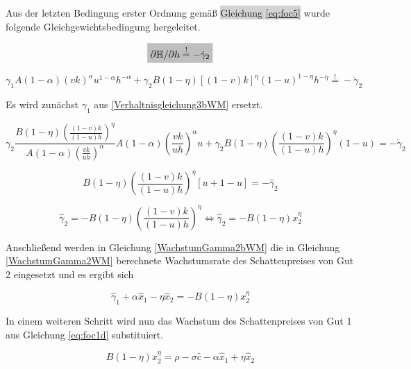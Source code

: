 Aus der letzten Bedingung erster Ordnung gemä{\ss} \colorbox{lightgray}{Gleichung \eqref{eq:foc5}} wurde folgende Gleichgewichtsbedingung hergeleitet.


	\begin{equation*}
		\colorbox{lightgray}{$\partial\mathbb{H}/\partial h\overset{!}{=}-\dot{\gamma}_2$}
	\end{equation*}


	\begin{equation}
		\gamma_1A(1-\alpha)(vk)^\alpha u^{1-\alpha}h^{-\alpha}+\gamma_2 B(1-\eta)[(1-v)k]^{\eta}(1-u)^{1-\eta}h^{-\eta}\overset{!}{=}-\dot{\gamma}_2
	\end{equation}


Es wird zunächst $\gamma_1$ aus \eqref{Verhaltnisgleichung3bWM} ersetzt. 


	\begin{equation*}
		\gamma_2\frac{B(1-\eta)\left(\frac{(1-v)k}{(1-u)h}\right)^\eta}{A(1-\alpha)\left(\frac{vk}{uh}\right)^{\alpha}}A(1-\alpha)\left(\frac{vk}{uh}\right)^{\alpha}u+\gamma_2 B(1-\eta)\left(\frac{(1-v)k}{(1-u)h}\right)^\eta(1-u)=-\dot{\gamma}_2
	\end{equation*}


	\begin{equation*}
		B(1-\eta)\left(\frac{(1-v)k}{(1-u)h}\right)^\eta[u+1-u]=-\hat{\gamma}_2
	\end{equation*}


	\begin{equation}
		\hat{\gamma}_2=-B(1-\eta)\left(\frac{(1-v)k}{(1-u)h}\right)^\eta\Longleftrightarrow \hat{\gamma}_2=-B(1-\eta)x_2^\eta\label{WachstumGamma2bWM}
	\end{equation}



Anschlie{\ss}end werden in Gleichung \eqref{WachstumGamma2bWM} die in Gleichung \eqref{WachstumGamma2WM} berechnete Wachstumsrate des Schattenpreises von Gut 2 eingesetzt und es ergibt sich 


	\begin{equation}
		\hat{\gamma}_{1}+\alpha\hat{x}_1-\eta\hat{x}_2 =-B(1-\eta)x_2^\eta
	\end{equation} 


In einem weiteren Schritt wird nun das Wachstum des Schattenpreises von Gut 1 aus Gleichung \eqref{eq:foc1d} substituiert. 


	\begin{equation}
		\boxed{B(1-\eta)x_2^\eta=\rho-\sigma\hat{c}-\alpha\hat{x}_1+\eta\hat{x}_2}
	\end{equation}


